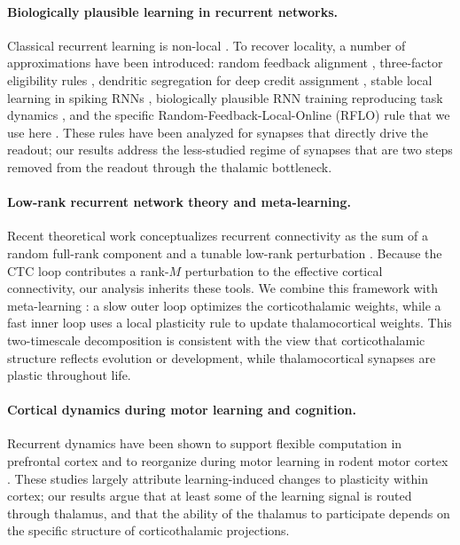 \paragraph{Biologically plausible learning in recurrent networks.}
Classical recurrent learning is non-local
\cite{williams1989learning}. To recover locality, a number of
approximations have been introduced: random feedback alignment
\cite{lillicrap2016random}, three-factor eligibility rules
\cite{gerstner2018eligibility, bittner2017behavioral}, dendritic
segregation for deep credit assignment \cite{guerguiev2017towards},
stable local learning in spiking RNNs \cite{gilra2017predicting},
biologically plausible RNN training reproducing task dynamics
\cite{miconi2017biologically}, and the specific Random-Feedback-Local-Online
(RFLO) rule that we use here \cite{murray2019local}. These rules have
been analyzed for synapses that directly drive the readout; our results
address the less-studied regime of synapses that are two steps removed
from the readout through the thalamic bottleneck.

\paragraph{Low-rank recurrent network theory and meta-learning.}
Recent theoretical work conceptualizes recurrent connectivity as the sum
of a random full-rank component and a tunable low-rank perturbation
\cite{mastrogiuseppe2018linking}. Because the CTC loop contributes a
rank-$M$ perturbation to the effective cortical connectivity, our
analysis inherits these tools. We combine this framework with
meta-learning \cite{wang2018prefrontal, hospedales2022meta}: a slow outer
loop optimizes the corticothalamic weights, while a fast inner loop uses
a local plasticity rule to update thalamocortical weights. This two-timescale
decomposition is consistent with the view that corticothalamic
structure reflects evolution or development, while thalamocortical
synapses are plastic throughout life.

\paragraph{Cortical dynamics during motor learning and cognition.}
Recurrent dynamics have been shown to support flexible computation in
prefrontal cortex and to reorganize during motor learning in rodent motor
cortex \cite{mante2013context, peters2014emergence,
churchland2012neural}. These studies largely attribute learning-induced
changes to plasticity within cortex; our results argue that at least some
of the learning signal is routed through thalamus, and that the ability
of the thalamus to participate depends on the specific structure of
corticothalamic projections.
